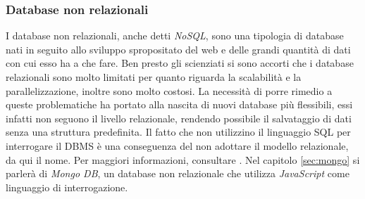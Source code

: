 \subsubsection{Database non relazionali}\label{sec:dbnonrel}
I database non relazionali, anche detti \emph{NoSQL}, sono una tipologia di database nati in seguito allo sviluppo spropositato del web e delle grandi quantità di dati con cui esso ha a che fare. Ben presto gli scienziati si sono accorti che i database relazionali sono molto limitati per quanto riguarda la scalabilità e la parallelizzazione, inoltre sono molto costosi. La necessità di porre rimedio a queste problematiche ha portato alla nascita di nuovi database più flessibili, essi infatti non seguono il livello relazionale, rendendo possibile il salvataggio di dati senza una struttura predefinita. Il fatto che non utilizzino il linguaggio SQL per interrogare il DBMS è una conseguenza del non adottare il modello relazionale, da qui il nome. Per maggiori informazioni, consultare \cite{nosql}. Nel capitolo \ref{sec:mongo} si parlerà di \emph{Mongo DB}, un database non relazionale che utilizza \emph{JavaScript} come linguaggio di interrogazione.
 
